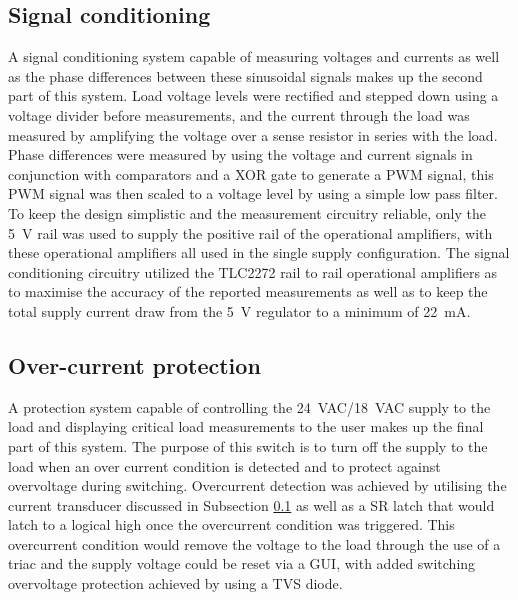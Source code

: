 \subsection{Signal conditioning}\label{subsec:signal}
A signal conditioning system capable of measuring voltages and currents as well as the phase differences between these sinusoidal signals makes up the second part of this system. Load voltage levels were rectified and stepped down using a voltage divider before measurements, and the current through the load was measured by amplifying the voltage over a sense resistor in series with the load. Phase differences were measured by using the voltage and current signals in conjunction with comparators and a XOR gate to generate a PWM signal, this PWM signal was then scaled to a voltage level by using a simple low pass filter. To keep the design simplistic and the measurement circuitry reliable, only the \SI{5}{\volt} rail was used to supply the positive rail of the operational amplifiers, with these operational amplifiers all used in the single supply configuration. The signal conditioning circuitry utilized the TLC2272 rail to rail operational amplifiers as to maximise the accuracy of the reported measurements as well as to keep the total supply current draw from the \SI{5}{\volt} regulator to a minimum of \SI{22}{\milli A}.

\subsection{Over-current protection}\label{subsec:protect}
A protection system capable of controlling the \SI{24}{VAC}/\SI{18}{VAC} supply to the load and displaying critical load measurements to the user makes up the final part of this system. The purpose of this switch is to turn off the supply to the load when an over current condition is detected and to protect against overvoltage during switching. Overcurrent detection was achieved by utilising the current transducer discussed in Subsection \ref{subsec:signal} as well as a SR latch that would latch to a logical high once the overcurrent condition was triggered. This overcurrent condition would remove the voltage to the load through the use of a triac and the supply voltage could be reset via a GUI, with added switching overvoltage protection achieved by using a TVS diode.

